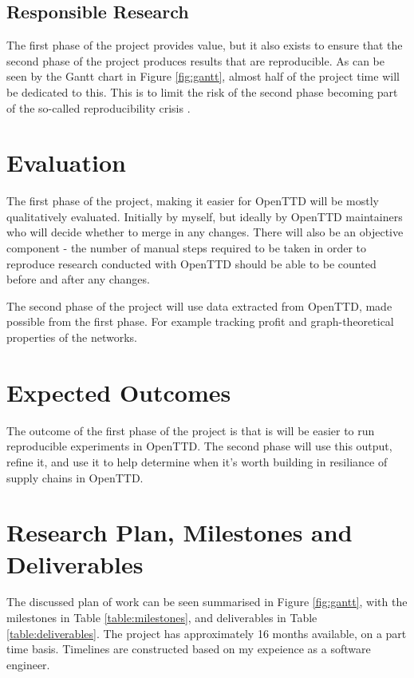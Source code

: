 \documentclass[a4paper,11pt]{article}
\begin{document}
\subsection{Responsible Research}

The first phase of the project provides value, but it also exists to ensure that the second phase of the project produces results that are reproducible. As can be seen by the Gantt chart in Figure \ref{fig:gantt}, almost half of the project time will be dedicated to this. This is to limit the risk of the second phase becoming part of the so-called reproducibility crisis \cite{baker_1500_2016}.

\section{Evaluation}

The first phase of the project, making it easier for OpenTTD will be mostly qualitatively evaluated. Initially by myself, but ideally by OpenTTD maintainers who will decide whether to merge in any changes. There will also be an objective component - the number of manual steps required to be taken in order to reproduce research conducted with OpenTTD should be able to be counted before and after any changes.

The second phase of the project will use data extracted from OpenTTD, made possible from the first phase. For example tracking profit and graph-theoretical properties of the networks.

\section{Expected Outcomes}

The outcome of the first phase of the project is that is will be easier to run reproducible experiments in OpenTTD. The second phase will use this output, refine it, and use it to help determine when it's worth building in resiliance of supply chains in OpenTTD.

\section{Research Plan, Milestones and Deliverables}

The discussed plan of work can be seen summarised in Figure \ref{fig:gantt}, with the milestones in Table \ref{table:milestones}, and deliverables in Table \ref{table:deliverables}. The project has approximately 16 months available, on a part time basis. Timelines are constructed based on my expeience as a software engineer.
\end{document}
